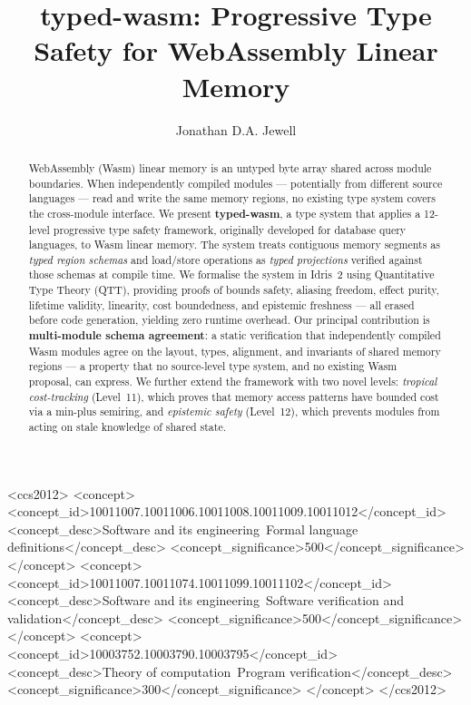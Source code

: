 \documentclass[sigplan,nonacm,screen]{acmart}
\title{typed-wasm: Progressive Type Safety for WebAssembly Linear Memory}
\author{Jonathan D.A. Jewell}
\affiliation{%
  \institution{The Open University}
  \city{Milton Keynes}
  \country{United Kingdom}
}
\begin{document}
\begin{abstract}
WebAssembly (Wasm) linear memory is an untyped byte array shared across
module boundaries. When independently compiled modules --- potentially from
different source languages --- read and write the same memory regions, no
existing type system covers the cross-module interface. We present
\textbf{typed-wasm}, a type system that applies a 12-level progressive
type safety framework, originally developed for database query languages,
to Wasm linear memory. The system treats contiguous memory segments as \emph{typed
region schemas} and load/store operations as \emph{typed projections} verified
against those schemas at compile time. We formalise the system in Idris~2
using Quantitative Type Theory (QTT), providing proofs of bounds safety,
aliasing freedom, effect purity, lifetime validity, linearity, cost
boundedness, and epistemic freshness --- all erased before code generation,
yielding zero runtime overhead. Our principal contribution is
\textbf{multi-module schema agreement}: a static verification that
independently compiled Wasm modules agree on the layout, types, alignment,
and invariants of shared memory regions --- a property that no source-level
type system, and no existing Wasm proposal, can express. We further extend
the framework with two novel levels: \emph{tropical cost-tracking}
(Level~11), which proves that memory access patterns have bounded cost via
a min-plus semiring, and \emph{epistemic safety} (Level~12), which prevents
modules from acting on stale knowledge of shared state.
\end{abstract}

\begin{CCSXML}
<ccs2012>
  <concept>
    <concept_id>10011007.10011006.10011008.10011009.10011012</concept_id>
    <concept_desc>Software and its engineering~Formal language definitions</concept_desc>
    <concept_significance>500</concept_significance>
  </concept>
  <concept>
    <concept_id>10011007.10011074.10011099.10011102</concept_id>
    <concept_desc>Software and its engineering~Software verification and validation</concept_desc>
    <concept_significance>500</concept_significance>
  </concept>
  <concept>
    <concept_id>10003752.10003790.10003795</concept_id>
    <concept_desc>Theory of computation~Program verification</concept_desc>
    <concept_significance>300</concept_significance>
  </concept>
</ccs2012>
\end{CCSXML}

\end{document}
